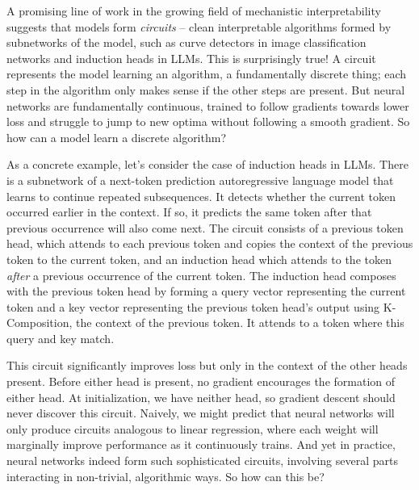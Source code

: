 \documentclass{article} %
\begin{document}
A promising line of work in the growing field of mechanistic interpretability suggests that models form \emph{circuits} \citep{cammarata2020thread} -- clean interpretable algorithms formed by subnetworks of the model, such as curve detectors \citep{cammarata2020thread} in image classification networks and induction heads \citep{elhage2021mathematical, olsson2022context} in LLMs. This is surprisingly true! A circuit represents the model learning an algorithm, a fundamentally discrete thing; each step in the algorithm only makes sense if the other steps are present. But neural networks are fundamentally continuous, trained to follow gradients towards lower loss and struggle to jump to new optima without following a smooth gradient. So how can a model learn a discrete algorithm?

As a concrete example, let's consider the case of induction heads in LLMs. There is a subnetwork of a next-token prediction autoregressive language model that learns to continue repeated subsequences. It detects whether the current token occurred earlier in the context. If so, it predicts the same token after that previous occurrence will also come next. The circuit consists of a previous token head, which attends to each previous token and copies the context of the previous token to the current token, and an induction head which attends to the token \emph{after} a previous occurrence of the current token. The induction head composes with the previous token head by forming a query vector representing the current token and a key vector representing the previous token head's output using K-Composition, the context of the previous token. It attends to a token where this query and key match. 

This circuit significantly improves loss but only in the context of the other heads present. Before either head is present, no gradient encourages the formation of either head. At initialization, we have neither head, so gradient descent should never discover this circuit. Naively, we might predict that neural networks will only produce circuits analogous to linear regression, where each weight will marginally improve performance as it continuously trains. And yet in practice, neural networks indeed form such sophisticated circuits, involving several parts interacting in non-trivial, algorithmic ways. So how can this be?
\end{document}
